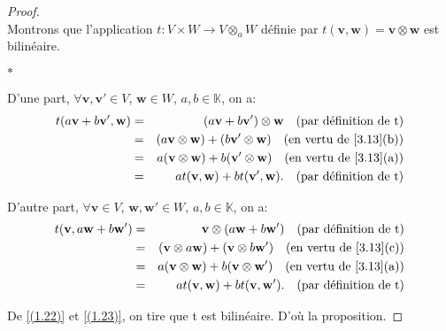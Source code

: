 \documentclass[11pt,a4paper,oneside]{book}
\newtheorem{proof}{Démonstration}
\def\K{\mathbb K}
\def\v{\mathbf v}
\def\w{\mathbf w}
\begin{document}
\begin{proof}
	\emph{\\}
Montrons que l'application $ t: V\times W \longrightarrow V\otimes_{a} W$ définie par $ t(\v,\w)=\v\otimes \w $ est bilinéaire.
\begin{list}{$ \ast $}{}
\item D'une part, $ \forall \v,\v'\in V $, $ \w\in W $, $ a,b\in\K $, on a:
\begin{eqnarray}
t(a\v+b\v',\w)&=&(a\v+b\v')\otimes \w \quad\text{(par définition de t)}\nonumber\\
&=&(a\v\otimes \w)+(b\v'\otimes \w)\quad\text{(en vertu de \eqref{3.13}(b))}\nonumber\\
&=&a(\v\otimes \w)+b(\v'\otimes \w)\quad\text{(en vertu de \eqref{3.13}(a))}\nonumber\\
&=&at(\v,\w)+bt(\v',\w).\quad\text{(par définition de t)}\label{(1.22)}
\end{eqnarray}
\item D'autre part, $ \forall \v\in V $, $ \w,\w'\in W $, $ a,b\in\K $, on a:
\begin{eqnarray}
t(\v,a\w+b\w')&=&\v\otimes(a\w+b\w')\quad\text{(par définition de t)}\nonumber\\
&=&(\v\otimes a\w)+(\v\otimes b\w')\quad\text{(en vertu de \eqref{3.13}(c))}\nonumber\\
&=&a(\v\otimes \w)+b(\v\otimes \w')\quad\text{(en vertu de \eqref{3.13}(a))}\nonumber\\
&=&at(\v,\w)+bt(\v,\w').\quad\text{(par définition de t)}\label{(1.23)}
\end{eqnarray}
\end{list}
De \eqref{(1.22)} et \eqref{(1.23)}, on tire que t est bilinéaire. D'où la proposition.
\end{proof}
\end{document}
